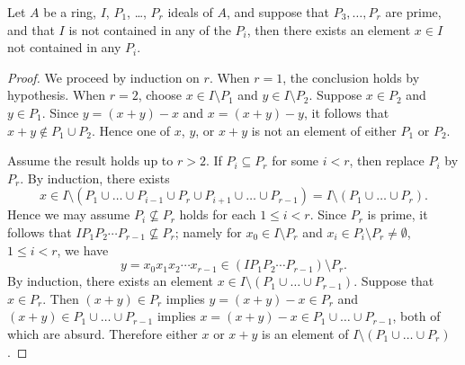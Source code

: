 \documentclass[10pt]{amsart}
\begin{document}
\begin{thm}
  Let $A$ be a ring, $I$, $P_1$, \ldots, $P_r$ ideals of $A$, and suppose that $P_3, \ldots, P_r$ are prime, and that $I$ is not contained in any of the $P_i$, then there exists an element $x \in I$ not contained in any $P_i$.

  \begin{proof}
    We proceed by induction on $r$.
    When $r = 1$, the conclusion holds by hypothesis.
    When $r = 2$, choose $x \in I \setminus P_1$ and $y \in I \setminus P_2$.
    Suppose $x \in P_2$ and $y \in P_1$.
    Since $y = (x + y) - x$ and $x = (x + y) - y$, it follows that $x + y \not \in P_1 \cup P_2$.
    Hence one of $x$, $y$, or $x + y$ is not an element of either $P_1$ or $P_2$.
    
    Assume the result holds up to $r > 2$.
    If $P_i \subseteq P_r$ for some $i < r$, then replace $P_i$ by $P_r$.
    By induction, there exists 
    $$x \in I \setminus (P_1 \cup \ldots \cup P_{i-1} \cup P_r \cup P_{i + 1} \cup \ldots \cup P_{r-1}) = I \setminus (P_1 \cup \ldots \cup P_{r}).$$
    Hence we may assume $P_i \not \subseteq P_r$ holds for each $1 \leq i < r$.
    Since $P_r$ is prime, it follows that $IP_1 P_2 \cdots P_{r - 1} \not \subseteq P_r$; 
    namely for $x_0 \in I \setminus P_r$ and $x_i \in P_i \setminus P_r \neq \emptyset$, $1 \leq i < r$, we have
    $$y = x_0 x_1 x_2 \cdots x_{r-1} \in (I P_1 P_2 \cdots P_{r-1}) \setminus P_r.$$
    By induction, there exists an element $x \in I \setminus (P_1 \cup \ldots \cup P_{r-1})$.
    Suppose that $x \in P_r$.
    Then $(x + y) \in P_r$ implies $y = (x + y) - x \in P_r$ and $(x + y) \in P_1 \cup \ldots \cup P_{r-1}$ implies $x = (x + y) - x \in P_1 \cup \ldots \cup P_{r-1}$, both of which are absurd.
    Therefore either $x$ or $x + y$ is an element of $I \setminus (P_1 \cup \ldots \cup P_r)$.
 
  \end{proof}
\end{thm}
\end{document}
